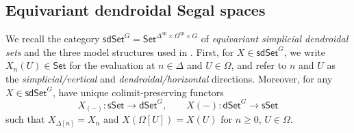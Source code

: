 \documentclass[a4paper,10pt
,draft
]{article}%
\numberwithin{equation}{section}
\numberwithin{figure}{section}
\theoremstyle{definition} %
\newtheorem{remark}[equation]{Remark}%
\newcommand{\into}{\hookrightarrow}%
\newcommand{\Set}{\ensuremath{\mathsf{Set}}}
\newcommand{\sSet}{\ensuremath{\mathsf{sSet}}}%
\newcommand{\Op}{\mathsf{Op}}%
\newcommand{\dSet}{\mathsf{dSet}}
\newcommand{\1}{\ensuremath{\mathbbm 1}}%
\begin{document}











\subsection{Equivariant dendroidal Segal spaces}
\label{JT_SEC}

We recall the category $\mathsf{sdSet}^G = \Set^{\Delta^{op} \times \Omega^{op} \times G}$ of \textit{equivariant simplicial dendroidal sets} and the three model structures used in \cite{BP_edss}.
First, for $X \in \mathsf{sdSet}^G$, we write $X_n(U) \in \Set$ for the evaluation at $n \in \Delta$ and $U \in \Omega$,
and refer to $n$ and $U$ as the \textit{simplicial/vertical} and \textit{dendroidal/horizontal} directions.
Moreover, for any $X \in \mathsf{sdSet}^G$, have unique colimit-preserving functors
\begin{equation}
      \label{SDSET_EQ}
      X_{(-)} \colon \sSet \to \dSet^G,
      \qquad
      X(-) \colon \dSet^G \to \sSet
\end{equation}
such that $X_{\Delta[n]} = X_n$ and $X(\Omega[U]) = X(U)$ for $n \geq 0$, $U \in \Omega$.
\end{document}
